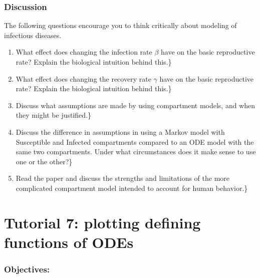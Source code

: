 \documentclass[
  letterpaper,
  DIV=11,
  numbers=noendperiod]{scrreprt}
\begin{document}
\hypertarget{discussion}{%
\subsection{Discussion}\label{discussion}}

The following questions encourage you to think critically about modeling
of infectious diseases.

\begin{enumerate}
\def\labelenumi{\arabic{enumi}.}
\item
  What effect does changing the infection rate \(\beta\) have on the
  basic reproductive rate? Explain the biological intuition behind
  this.\}
\item
  What effect does changing the recovery rate \(\gamma\) have on the
  basic reproductive rate? Explain the biological intuition behind
  this.\}
\item
  Discuss what assumptions are made by using compartment models, and
  when they might be justified.\}
\item
  Discuss the difference in assumptions in using a Markov model with
  Susceptible and Infected compartments compared to an ODE model with
  the same two compartments. Under what circumstances does it make sense
  to use one or the other?\}
\item
  Read the paper \cite{agusto_mathematical_2015} and discuss the
  strengths and limitations of the more complicated compartment model
  intended to account for human behavior.\}
\end{enumerate}


\hypertarget{tutorial-7-plotting-defining-functions-of-odes}{%
\chapter*{Tutorial 7: plotting defining functions of
ODEs}\label{tutorial-7-plotting-defining-functions-of-odes}}


\hypertarget{objectives-2}{%
\subsection*{Objectives:}\label{objectives-2}}
\end{document}
